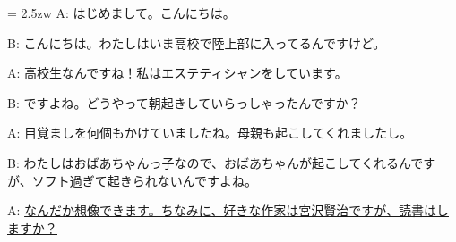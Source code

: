 \documentclass[11pt]{amsart}
\title{}
\author{}
\newenvironment{hangall}[1]{\hangindent = 2.5zw\everypar{\hangindent = 2.5zw}}{}
\begin{document}
\maketitle
\begin{hangall}{}%
A: はじめまして。こんにちは。

B: こんにちは。わたしはいま高校で陸上部に入ってるんですけど。

A: 高校生なんですね！私はエステティシャンをしています。

B: ですよね。どうやって朝起きしていらっしゃったんですか？

A: 目覚ましを何個もかけていましたね。母親も起こしてくれましたし。

B: わたしはおばあちゃんっ子なので、おばあちゃんが起こしてくれるんですが、ソフト過ぎて起きられないんですよね。

A: \ul{なんだか想像できます。ちなみに、好きな作家は宮沢賢治ですが、読書はしますか？}\end{hangall}
\end{document}
